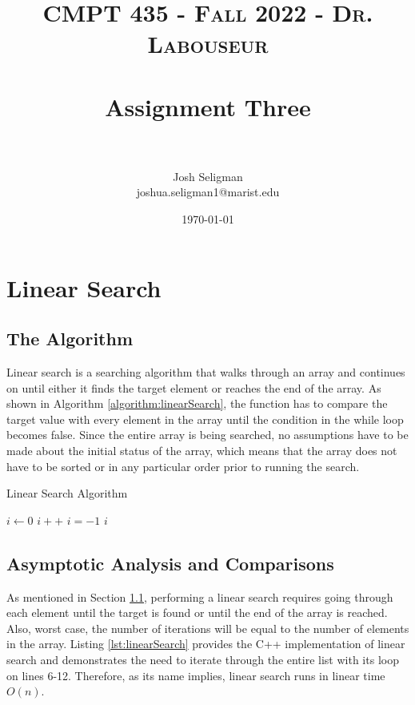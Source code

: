\documentclass[letterpaper, 10pt,DIV=13]{scrartcl}
\title{	
   \normalfont \normalsize 
   \textsc{CMPT 435 - Fall 2022 - Dr. Labouseur} \\[10pt] %
   \horrule{0.5pt} \\[0.25cm] 	%
   \huge Assignment Three  \\     	    %
   \horrule{0.5pt} \\[0.25cm] 	%
}
\author{Josh Seligman \\ \normalsize joshua.seligman1@marist.edu}
\date{\normalsize\today} 	%
\numberwithin{equation}{section} %
\numberwithin{figure}{section} %
\numberwithin{table}{section} %
\begin{document}
\maketitle %

\section{Linear Search}
\subsection{The Algorithm}\label{linearSearch}
Linear search is a searching algorithm that walks through an array and continues on until either it finds the target element or reaches the end of the array. As shown in Algorithm \ref{algorithm:linearSearch}, the function has to compare the target value with every element in the array until the condition in the while loop becomes false. Since the entire array is being searched, no assumptions have to be made about the initial status of the array, which means that the array does not have to be sorted or in any particular order prior to running the search.

\begin{algorithm}
  \caption{Linear Search Algorithm}
  \label{algorithm:linearSearch}
  \begin{algorithmic}[1]
        \State $i \gets 0$ 
         
          \State $i++$
        \EndWhile
          \State $i = -1$ 
        \EndIf
        \State \Return $i$
      \EndProcedure
  \end{algorithmic}
\end{algorithm}

\subsection{Asymptotic Analysis and Comparisons}
As mentioned in Section \ref{linearSearch}, performing a linear search requires going through each element until the target is found or until the end of the array is reached. Also, worst case, the number of iterations will be equal to the number of elements in the array. Listing \ref{lst:linearSearch} provides the C++ implementation of linear search and demonstrates the need to iterate through the entire list with its loop on lines 6-12. Therefore, as its name implies, linear search runs in linear time $O(n)$.
\end{document}

